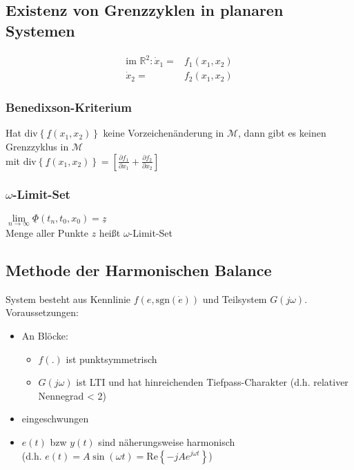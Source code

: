 \documentclass[6pt,a4paper,fleqn]{scrartcl}
\begin{document}
\begin{multicols*}{4}
\subsection{Existenz von Grenzzyklen in planaren Systemen}

\begin{align*}
  \text{im $\mathbb{R}^2$:} \,
  \dot{x}_1 =&  f_1(x_1, x_2) \\
  \dot{x}_2 =&  f_2(x_1, x_2)
\end{align*}

\subsubsection*{Benedixson-Kriterium}
Hat div$\left\{ \underline{f}(x_1, x_2) \right\}$ keine Vorzeichenänderung in $\mathcal{M}$, dann gibt es keinen Grenzzyklus in $\mathcal{M}$ \\
mit $\text{div}\left\{ \underline{f}(x_1, x_2) \right\} = \left[ \frac{\partial f_1}{\partial x_1} + \frac{\partial f_2}{ \partial x_2} \right]$

\subsubsection*{$\omega$-Limit-Set}

$\lim\limits_{n \rightarrow \infty} \underline{\Phi} (t_n, t_0, x_0) = \underline{z}$ \\
Menge aller Punkte $z$ heißt $\omega$-Limit-Set

\subsection{Methode der Harmonischen Balance}

System besteht aus Kennlinie $f(e, \text{sgn}(\dot{e}))$ und Teilsystem $G(j\omega)$. \\
Voraussetzungen:
\begin{itemize}
  \item An Blöcke:
    \begin{itemize}
      \item $f(.)$ ist punktsymmetrisch
      \item $G(j\omega)$ ist LTI und hat hinreichenden Tiefpass-Charakter (d.h. relativer Nennegrad < 2)
    \end{itemize}
  \item eingeschwungen
  \item $e(t)$ bzw $y(t)$ sind näherungsweise harmonisch \\ (d.h. $e(t) = A \sin(\omega t) = \text{Re} \left\{ -j A e^{j\omega t} \right\}$)
\end{itemize}


\end{multicols*}
\end{document}
